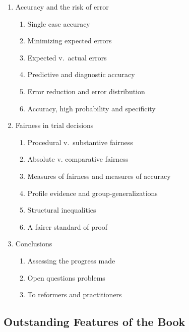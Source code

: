 \documentclass[
  10pt,
  dvipsnames,enabledeprecatedfontcommands]{scrartcl}
\begin{document}
\begin{multicols}{2}
\begin{enumerate}
\begin{enumerate}
  \item  Accuracy and the risk of error
  \begin{enumerate}
  \item  Single case accuracy
  \item  Minimizing expected errors
  \item  Expected v.\ actual errors
  \item  Predictive and diagnostic accuracy
  \item  Error reduction and error distribution
  \item  Accuracy, high probability and specificity 
  \end{enumerate}


  \item  Fairness in trial decisions
  \begin{enumerate}
  \item  Procedural v.\ substantive fairness
  \item  Absolute v. comparative fairness 
  \item  Measures of fairness and measures of accuracy 
  \item  Profile evidence and group-generalizations
  \item  Structural inequalities 
  \item  A fairer standard of proof
  \end{enumerate}


\item Conclusions
\begin{enumerate}
\item  Assessing the progress made
\item  Open questions problems 
\item  To reformers and practitioners
\end{enumerate}
\end{enumerate}
\end{enumerate}

\end{multicols}

\normalsize

\hypertarget{outstanding-features-of-the-book}{%
\subsection{Outstanding Features of the
Book}\label{outstanding-features-of-the-book}}
\end{document}
